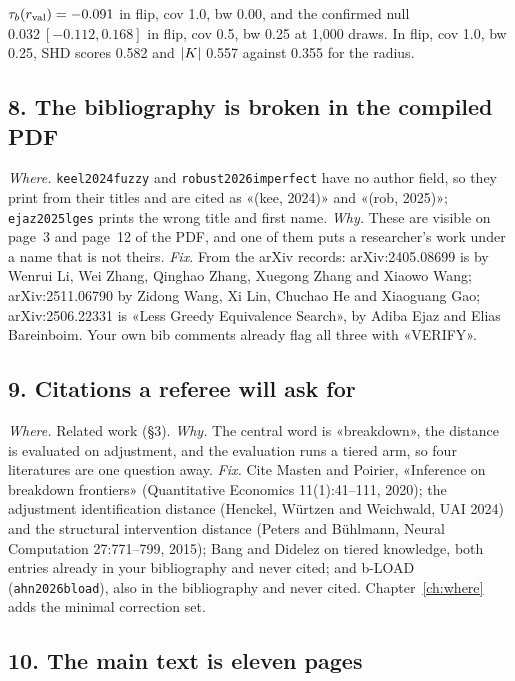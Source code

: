 %
{$\tau_b(r_{\mathrm{val}}) = -0.091$ in flip, cov 1.0, bw 0.00, and the confirmed null $0.032\ [-0.112, 0.168]$ in
flip, cov 0.5, bw 0.25 at 1,000 draws. In flip, cov 1.0, bw 0.25, SHD scores 0.582 and $|K|$ 0.557
against 0.355 for the radius.}

\subsection*{8. The bibliography is broken in the compiled PDF}

\emph{Where.} \texttt{keel2024fuzzy} and \texttt{robust2026imperfect} have no author field, so they print
from their titles and are cited as «(kee, 2024)» and «(rob, 2025)»; \texttt{ejaz2025lges} prints the wrong
title and first name. \emph{Why.} These are visible on page~3 and page~12 of the PDF, and one of them puts a
researcher's work under a name that is not theirs. \emph{Fix.} From the arXiv records: arXiv:2405.08699 is
by Wenrui Li, Wei Zhang, Qinghao Zhang, Xuegong Zhang and Xiaowo Wang; arXiv:2511.06790 by Zidong Wang, Xi
Lin, Chuchao He and Xiaoguang Gao; arXiv:2506.22331 is «Less Greedy Equivalence Search», by Adiba Ejaz
and Elias Bareinboim. Your own bib comments already flag all three with «VERIFY».

\subsection*{9. Citations a referee will ask for}

\emph{Where.} Related work (\S3). \emph{Why.} The central word is «breakdown», the distance is evaluated on
adjustment, and the evaluation runs a tiered arm, so four literatures are one question away. \emph{Fix.}
Cite Masten and Poirier, «Inference on breakdown frontiers» (Quantitative Economics 11(1):41--111, 2020);
the adjustment identification distance (Henckel, Würtzen and Weichwald, UAI 2024) and the structural
intervention distance (Peters and Bühlmann, Neural Computation 27:771--799, 2015); Bang and Didelez on
tiered knowledge, both entries already in your bibliography and never cited; and b-LOAD
(\texttt{ahn2026bload}), also in the bibliography and never cited. Chapter~\ref{ch:where} adds the minimal
correction set.

\subsection*{10. The main text is eleven pages}

